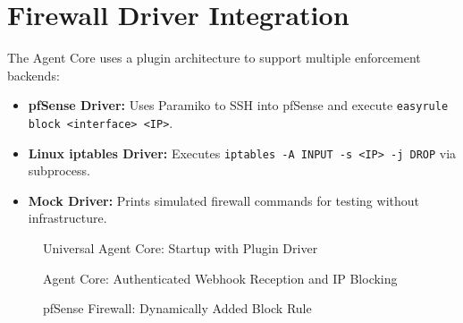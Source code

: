 \section{Firewall Driver Integration}

The Agent Core uses a plugin architecture to support multiple enforcement backends:

\begin{itemize}
    \item \textbf{pfSense Driver:} Uses Paramiko to SSH into pfSense and execute \texttt{easyrule block <interface> <IP>}.
    \item \textbf{Linux iptables Driver:} Executes \texttt{iptables -A INPUT -s <IP> -j DROP} via subprocess.
    \item \textbf{Mock Driver:} Prints simulated firewall commands for testing without infrastructure.
\end{itemize}

\begin{figure}[h]
\centering
{}
\caption{Universal Agent Core: Startup with Plugin Driver}
\label{fig:agent_core_startup}
\end{figure}

\begin{figure}[h]
\centering
{}
\caption{Agent Core: Authenticated Webhook Reception and IP Blocking}
\label{fig:agent_webhook}
\end{figure}

\begin{figure}[h]
\centering
{}
\caption{pfSense Firewall: Dynamically Added Block Rule}
\label{fig:pfsense_rule}
\end{figure}

